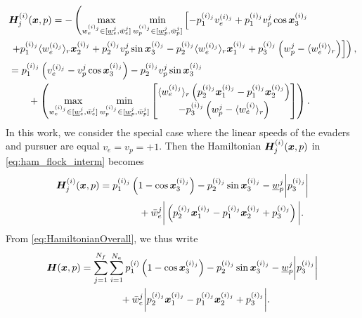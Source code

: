 \begin{align}
\begin{split}
&\bm{H}^{(i)}_j(\state, p)=- \left(\max_{w_e^{(i)_j} \in [\underline{w}_e^j, \bar{w}_e^j]}  \min_{w_p^{(i)_j}  \in [\underline{w}_p^{j}, \bar{w}_p^j]}  
\left[
-p_1^{(i)_j} v_e^{(i)_j} + p_1^{(i)_j} v_p^{j} \cos \state_3^{(i)_j} 
\right. \right.  \\ 
%
& \left. \left. +  p_1^{(i)_j}\langle w_e^{(i)_j} \rangle_r \state_2^{(i)_j} 
%
+ p_2^{(i)_j} v_p^{j} \sin \state_3^{(i)_j} - p_2^{(i)_j} \langle w_e^{(i)_j} \rangle_r  \state_1^{(i)_j} 
%
+ p_3^{(i)_j}\left(w_p^j - \langle w_e^{(i)} \rangle_r\right)
\right] 
%
\right),
\\
%
&=p_1^{(i)_j} \left(v_e^{(i)_j} - v_p^{j} \cos \state_3^{(i)_j}\right) -  p_2^{(i)_j} v_p^{j} \sin \state_3^{(i)_j}  \\
%
& \qquad + \left(		
\max_{w_e^{(i)_j} \in [\underline{w}_e^j, \bar{w}_e^j]}  \min_{w_p^{(i)_j}  \in [\underline{w}_p^{j}, \bar{w}_p^j]} \begin{bmatrix}
\langle w_e^{(i)_j}\rangle_r \left(p_2^{(i)_j} \state_1^{(i)_j} - p_1^{(i)_j}  \state_2^{(i)_j} \right) 
% 
\\ 
- p_3^{(i)_j} \left(w_p^j - \langle w_e^{(i)}\rangle_r\right)
\end{bmatrix}
\right).
\end{split}
%
\label{eq:ham_flock_interm}
\end{align}
%
In this work, we consider the special case where the linear speeds of the evaders and pursuer are equal \ie $v_e = v_p = +1$.  Then the Hamiltonian $\bm{H}^{(i)}_j(\bm{x}, p)$ in \eqref{eq:ham_flock_interm} becomes 
%
\begin{align}
\bm{H}^{(i)}_j(\bm{x}, p) &= p_1^{(i)_j} \left(1 - \cos \bm{x}_3^{(i)_j}\right) - p_2^{(i)_j} \sin \bm{x}_3^{(i)_j} - \underline{w}_p^j \bigg|p_3^{(i)_j}\bigg| \nonumber 	\\
& \qquad\qquad  
 + \bar{w}_e^j \bigg|\left(p_2^{(i)_j} \bm{x}_1^{(i)_j} - p_1^{(i)_j}\bm{x}_2^{(i)_j} + p_3^{(i)_j}\right)\bigg|  .
\end{align}
%
From \eqref{eq:HamiltonianOverall}, we thus write
%
\begin{align}
\bm{H}(\state, p) &= \sum_{j=1}^{N_f} \sum_{i=1}^{N_a} p_1^{(i)} \left(1 - \cos \state_3^{(i)_j}\right) - p_2^{(i)_j} \sin \state_3^{(i)_j} - \underline{w}_p^j \bigg|p_3^{(i)_j}\bigg|  \nonumber 	\\
& \qquad\qquad %
+ \bar{w}_e^j \bigg| p_2^{(i)_j} \state_1^{(i)_j} - p_1^{(i)_j}\state_2^{(i)_j} + p_3^{(i)_j}\bigg|.
\label{eq:HamiltonianCompletada}
\end{align}
